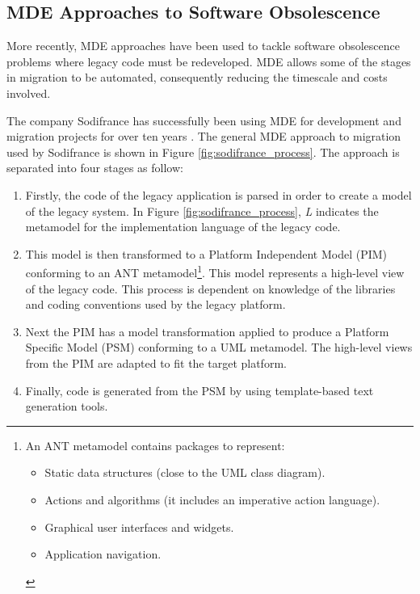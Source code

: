 \documentclass{UoYCSproject}
\begin{document}
\subsection{MDE Approaches to Software Obsolescence} \label{mde_approaches}
More recently, MDE approaches have been used to tackle software obsolescence problems where legacy code must be redeveloped. MDE allows some of the stages in migration to be automated, consequently reducing the timescale and costs involved.

The company Sodifrance has successfully been using MDE for development and migration projects for over ten years \parencite{fleurey2007model}. The general MDE approach to migration used by Sodifrance is shown in Figure \ref{fig:sodifrance_process}. The approach is separated into four stages as follow:

\begin{enumerate}
\item Firstly, the code of the legacy application is parsed in order to create a model of the legacy system. In Figure \ref{fig:sodifrance_process}, \textit{L} indicates the metamodel for the implementation language of the legacy code.
\item This model is then transformed to a Platform Independent Model (PIM) conforming to an ANT metamodel\footnote{An ANT metamodel contains packages to represent:
\begin{itemize}
\item Static data structures (close to the UML class diagram).
\item Actions and algorithms (it includes an imperative action language).
\item Graphical user interfaces and widgets.
\item Application navigation.
\end{itemize}}. This model represents a high-level view of the legacy code. This process is dependent on knowledge of the libraries and coding conventions used by the legacy platform.
\item Next the PIM has a model transformation applied to produce a Platform Specific Model (PSM) conforming to a UML metamodel. The high-level views from the PIM are adapted to fit the target platform.
\item Finally, code is generated from the PSM by using template-based text generation tools.
\end{enumerate}
\end{document}
